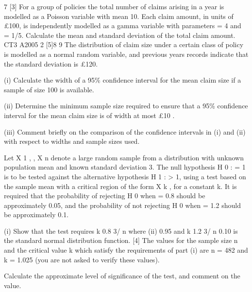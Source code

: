 \documentclass[a4paper,12pt]{article}
\begin{document}
\begin{enumerate}
7
[3]
For a group of policies the total number of claims arising in a year is modelled as a Poisson variable with mean 10. Each claim amount, in units of £100, is independently modelled as a gamma variable with parameters = 4 and = 1/5.
Calculate the mean and standard deviation of the total claim amount.
CT3 A2005
2
[5]8
9
The distribution of claim size under a certain class of policy is modelled as a normal random variable, and previous years records indicate that the standard deviation is £120.

(i) Calculate the width of a 95\% confidence interval for the mean claim size if a sample of size 100 is available.

(ii) Determine the minimum sample size required to ensure that a 95\% confidence interval for the mean claim size is of width at most £10 .

(iii) Comment briefly on the comparison of the confidence intervals in (i) and (ii) with respect to widths and sample sizes used.


Let X 1 , , X n denote a large random sample from a distribution with unknown population mean and known standard deviation 3. The null hypothesis H 0 : = 1 is to be tested against the alternative hypothesis H 1 : > 1, using a test based on the
sample mean with a critical region of the form X
k , for a constant k.
It is required that the probability of rejecting H 0 when = 0.8 should be approximately 0.05, and the probability of not rejecting H 0 when = 1.2 should be approximately 0.1.

(i)
Show that the test requires
k 0.8
3/ n
where
(ii)
0.95 and
k 1.2
3/ n
0.10
is the standard normal distribution function.
[4]
The values for the sample size n and the critical value k which satisfy the requirements of part (i) are n = 482 and k = 1.025 (you are not asked to verify these values).

Calculate the approximate level of significance of the test, and comment on the value.



\end{enumerate}
\end{document}
